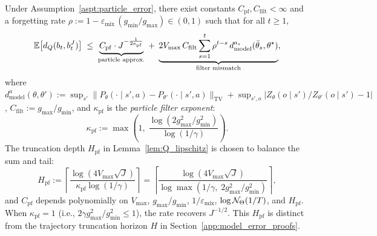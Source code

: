     \begin{prop}\label{prop:particle_error}
    Under Assumption~\ref{aspt:particle_error}, there exist constants $C_{\mathrm{pf}},C_{\mathrm{filt}}<\infty$ and a forgetting rate $\rho:=1-\varepsilon_{\mathrm{mix}}\,(g_{\min}/g_{\max})\in(0,1)$ such that for all $t\ge 1$,
    \begin{equation}\label{eq:pf_dQ_main}
    \mathbb{E}\bigl[d_Q(b_t,b_t^J)\bigr]
    \;\le\;
    \underbrace{C_{\mathrm{pf}}\cdot J^{-\frac{1}{2\kappa_{\mathrm{pf}}}}}_{\text{particle approx.}}
    \;+\;
    \underbrace{2V_{\max}\,C_{\mathrm{filt}}\sum_{s=1}^t \rho^{t-s}\,d_{\mathrm{model}}^{a_s}(\bar\theta_s,\theta^\star)}_{\text{filter mismatch}},
    \end{equation}
    where $d_{\mathrm{model}}^{a}(\theta,\theta'):=\sup_{s'}\|P_\theta(\cdot\mid s',a)-P_{\theta'}(\cdot\mid s',a)\|_{\mathrm{TV}}+\sup_{s',o}|Z_\theta(o\mid s')/Z_{\theta'}(o\mid s')-1|$, $C_{\mathrm{filt}}:=g_{\max}/g_{\min}$, and $\kappa_{\mathrm{pf}}$ is the \emph{particle filter exponent}:
    \begin{equation}\label{eq:kappa_pf_def}
    \kappa_{\mathrm{pf}}:=\max\!\left(1,\;\frac{\log(2g_{\max}^2/g_{\min}^2)}{\log(1/\gamma)}\right).
    \end{equation}
    The truncation depth $H_{\mathrm{pf}}$ in Lemma~\ref{lem:Q_lipschitz} is chosen to balance the sum and tail:
    \begin{equation}\label{eq:Hpf_choice}
    H_{\mathrm{pf}}:=\left\lceil\frac{\log(4V_{\max}\sqrt{J})}{\kappa_{\mathrm{pf}}\log(1/\gamma)}\right\rceil
    =\left\lceil\frac{\log(4V_{\max}\sqrt{J})}{\log\max(1/\gamma,\;2g_{\max}^2/g_{\min}^2)}\right\rceil,
    \end{equation}
    and $C_{\mathrm{pf}}$ depends polynomially on $V_{\max}$, $g_{\max}/g_{\min}$, $1/\varepsilon_{\mathrm{mix}}$, $\log{\mathcal{N}}_\Theta(1/T)$, and $H_{\mathrm{pf}}$. When $\kappa_{\mathrm{pf}}=1$ (i.e., $2\gamma g_{\max}^2/g_{\min}^2\le 1$), the rate recovers $J^{-1/2}$. This $H_{\mathrm{pf}}$ is distinct from the trajectory truncation horizon $H$ in Section~\ref{app:model_error_proofs}.
    \end{prop}


